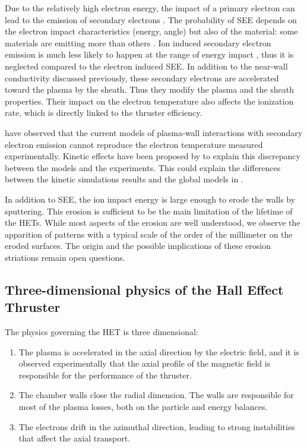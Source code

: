   Due to the relatively high electron energy, the impact of a primary electron can lead to the emission of secondary electrons \citep{barral2003a,villemant2018}.
  The probability of \ac{SEE} depends on the electron impact characteristics (energy, angle) but also of the material\string: some materials are emitting more than others \citep{gascon2003}.
  Ion induced secondary electron emission is much less likely to happen at the range of energy impact \citep{ohya2004}, thus it is neglected compared to the electron induced \ac{SEE}.
  In addition to the near-wall conductivity discussed previously, these secondary electrons are accelerated toward the plasma by the sheath.
  Thus they modify the plasma and the sheath properties.
  Their impact on the electron temperature also affects the ionization rate, which is directly linked to the thruster efficiency.
  
  
  \citet{raitses2005} have observed that the current models of plasma-wall interactions with secondary electron emission cannot reproduce the electron temperature measured experimentally.
  Kinetic effects have been proposed by \citet{sydorenko2007} to explain this discrepancy between the models and the experiments.
  This could explain the differences between the kinetic simulations results and the global models in \citet{croes2017}.   
    
  \vspace{1em}
  In addition to \ac{SEE}, the ion impact energy is large enough to erode the walls by sputtering.
  This erosion is sufficient to be the main limitation of the lifetime of the \ac{HET}s.
  While most aspects of the erosion are well understood, we observe the apparition of  patterns with a typical scale of the order of the millimeter on the eroded surfaces.
  The origin and the possible implications of these erosion striations remain open questions.
  

\subsection{Three-dimensional physics of the Hall Effect Thruster}
\label{sec-3Dphi}

The physics governing the \ac{HET} is three dimensional\string:
\begin{enumerate}
  \item The plasma is accelerated in the axial direction by the electric field, and it is observed experimentally that the axial profile of the magnetic field is responsible for the performance of the thruster.
  \item The chamber walls close the radial dimension. The walls are responsible for most of the plasma losses, both on the particle and energy balances.
  \item The electrons drift in the azimuthal direction, leading to strong instabilities that affect the axial transport.
\end{enumerate}

